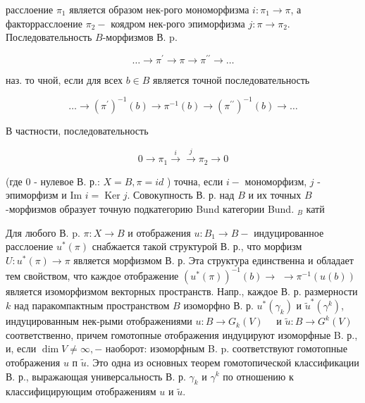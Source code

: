 \documentclass[10pt]{article}
\begin{document}
расслоение $\pi_{1}$ является образом нек-рого мономорфизма $i: \pi_{1} \rightarrow \pi$, а факторрасслоение $\pi_{2}-$ коядром нек-рого эпиморфизма $j: \pi \rightarrow \pi_{2}$. Последовательность $B$-морфизмов В. p.



\[

\ldots \rightarrow \pi^{\prime} \rightarrow \pi \rightarrow \pi^{\prime \prime} \rightarrow \ldots

\]



наз. то чной, если для всех $b \in B$ является точной последовательность



\[

\ldots \rightarrow\left(\pi^{\prime}\right)^{-1}(b) \rightarrow \pi^{-1}(b) \rightarrow\left(\pi^{\prime \prime}\right)^{-1}(b) \rightarrow \ldots

\]



В частности, последовательность



\[

0 \rightarrow \pi_{1} \stackrel{i}{\rightarrow} \stackrel{j}{\rightarrow} \pi_{2} \rightarrow 0

\]



(где 0 - нулевое В. р.: $X=B, \pi=i d$ ) точна, если $i-$ мономорфизм, $j$ - эпиморфизм и Im $i=\operatorname{Ker} j$. Совокупность В. р. над $B$ и их точных $B$-морфизмов образует точную подкатегорию Bund категории Bund. $_{B}$ катй



Для любого В. p. $\pi: X \rightarrow B$ и отображения $u: B_{1} \rightarrow B-$ индуцированное расслоение $u^{*}(\pi)$ снабжается такой структурой В. р., что морфизм $U: u^{*}(\pi) \rightarrow \pi$ является морфизмом В. р. Эта структура единственна и обладает тем свойством, что каждое отображение $\left(u^{*}(\pi)\right)^{-1}(b) \rightarrow$ $\rightarrow \pi^{-1}(u(b))$ является изоморфизмом векторных пространств. Напр., каждое В. р. размерности $k$ над паракомпактным пространством $B$ изоморфно В. р. $u^{*}\left(\gamma_{k}\right)$ и $\tilde{u}^{*}\left(\gamma^{k}\right)$, индуцированным нек-рыми отображениями $u: B \rightarrow G_{k}(V) \quad$ и $\tilde{u}: B \rightarrow G^{k}(V)$ соответственно, причем гомотопные отображения индуцируют изоморфные B. р., и, если $\operatorname{dim} V \neq \infty,-$ наоборот: изоморфным B. p. соответствуют гомотопные отображения $u$ п $\tilde{u}$. Это одна из основных теорем гомотопической классификации В. р., выражающая универсальность В. р. $\gamma_{k}$ и $\gamma^{k}$ по отношению к классифицирующим отображениям $u$ и $\tilde{u}$.
\end{document}
